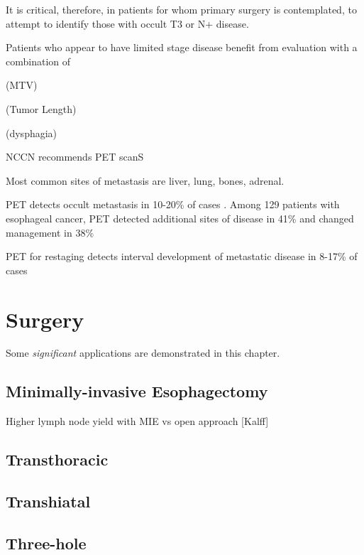 \documentclass[
]{book}
\begin{document}
It is critical, therefore, in patients for whom primary surgery is contemplated, to attempt to identify those with occult T3 or N+ disease.

Patients who appear to have limited stage disease benefit from evaluation with a combination of

(MTV)

(Tumor Length)

(dysphagia)

NCCN recommends PET scanS

Most common sites of metastasis are liver, lung, bones, adrenal.

PET detects occult metastasis in 10-20\% of cases \citep[\citet{kim403}]{kato921}. Among 129 patients with esophageal cancer, PET detected additional sites of disease in 41\% and changed management in 38\% \citep{chatterton354}

PET for restaging detects interval development of metastatic disease in 8-17\% of cases \citep{vanvliet547}

\hypertarget{surgery}{%
\chapter{Surgery}\label{surgery}}

Some \emph{significant} applications are demonstrated in this chapter.

\hypertarget{minimally-invasive-esophagectomy}{%
\section{Minimally-invasive Esophagectomy}\label{minimally-invasive-esophagectomy}}

Higher lymph node yield with MIE vs open approach {[}Kalff{]}

\hypertarget{transthoracic}{%
\section{Transthoracic}\label{transthoracic}}

\hypertarget{transhiatal}{%
\section{Transhiatal}\label{transhiatal}}

\hypertarget{three-hole}{%
\section{Three-hole}\label{three-hole}}
\end{document}
